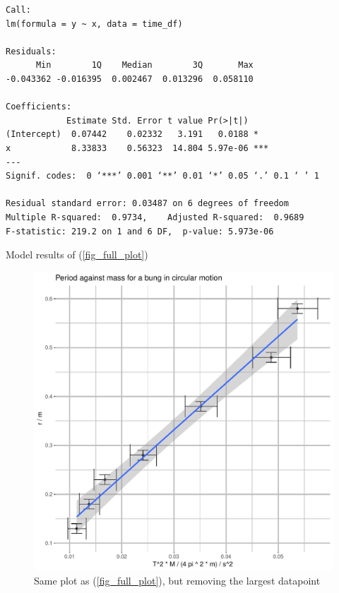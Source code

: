 \documentclass[a4paper,11pt]{article}
\newenvironment{longlisting}
{\addvspace{\baselineskip}\captionsetup{type=listing}}
{\addvspace{\baselineskip}}
\begin{document}
\begin{longlisting}
\begin{verbatim}
Call:
lm(formula = y ~ x, data = time_df)

Residuals:
      Min        1Q    Median        3Q       Max
-0.043362 -0.016395  0.002467  0.013296  0.058110

Coefficients:
            Estimate Std. Error t value Pr(>|t|)
(Intercept)  0.07442    0.02332   3.191   0.0188 *
x            8.33833    0.56323  14.804 5.97e-06 ***
---
Signif. codes:  0 ‘***’ 0.001 ‘**’ 0.01 ‘*’ 0.05 ‘.’ 0.1 ‘ ’ 1

Residual standard error: 0.03487 on 6 degrees of freedom
Multiple R-squared:  0.9734,	Adjusted R-squared:  0.9689
F-statistic: 219.2 on 1 and 6 DF,  p-value: 5.973e-06
\end{verbatim}
\caption{Model results of (\ref{fig_full_plot})}
\label{lst_full}
\end{longlisting}

\begin{figure}[h]
\includegraphics[width=\textwidth]{curated_plot.pdf}
\caption{Same plot as (\ref{fig_full_plot}), but removing the largest datapoint}
\label{fig_cur_plot}
\end{figure}
\end{document}
